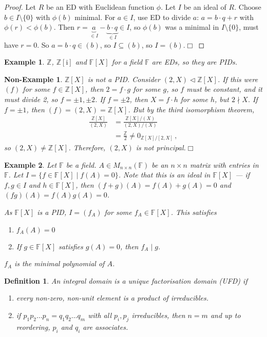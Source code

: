 \documentclass{article}
\theoremstyle{plain}\theoremheaderfont{\normalfont\itshape}\theorembodyfont{\rmfamily}\theoremseparator{.}\newtheorem*{rem}{Remark}\newtheorem*{ex}{Example}\newtheorem*{proof}{Proof}\newtheorem*{altp}{Alternative proof}\newtheorem*{nonex}{Non-Example}
\theoremstyle{plain}\theoremheaderfont{\normalfont\bfseries}\theorembodyfont{\rmfamily}\theoremseparator{.}\newtheorem{thm}{Theorem}[section]\newtheorem{lem}[thm]{Lemma}\newtheorem{prop}[thm]{Proposition}\newtheorem*{cor}{Corollary}\newtheorem{defn}[thm]{Definition}\newtheorem{clm}[thm]{Claim}\newtheorem{clminproof}{Claim}\newtheorem*{notn}{Notation}\newtheorem*{exer}{Exercise}\newtheorem*{lemnn}{Lemma}
\theoremstyle{break}\theoremheaderfont{\normalfont\itshape}\theorembodyfont{\rmfamily}\theoremseparator{.\medskip}\newtheorem*{proofskip}{Proof}\newtheorem*{exs}{Examples}\newtheorem*{rems}{Remarks}\newtheorem*{obs}{Observations}
\theoremstyle{break}\theoremheaderfont{\normalfont\bfseries}\theorembodyfont{\rmfamily}\theoremseparator{.\medskip}\newtheorem{lemskip}[thm]{Lemma}\newtheorem{defnskip}[thm]{Definition}\newtheorem{propskip}[thm]{Proposition}\newtheorem{thmskip}[thm]{Theorem}
\numberwithin{equation}{section}
\newcommand{\qed}{\hfill\ensuremath{\Box}}
\newcommand{\ii}{\mathrm{i}}
\newcommand{\ZZ}{\mathbb{Z}}
\newcommand{\FF}{\mathbb{F}}
\begin{document}
    \begin{proof}
        Let \(R\) be an ED with Euclidean function \(\phi\). Let \(I\) be an ideal of \(R\). Choose \(b\in I\setminus\{0\}\) with \(\phi(b)\) minimal. For \(a\in I\), use ED to divide \(a\): \(a=b\cdot q+r\) with \(\phi(r)<\phi(b)\). Then \(r=\underbrace{a}_{\in I}-\underbrace{b\cdot q}_{\in I}\in I\), so \(\phi(b)\) was a minimal in \(I\setminus\{0\}\), must have \(r=0\). So \(a=b\cdot q\in (b)\), so \(I\subseteq (b)\), so \(I=(b)\).\qed
    \end{proof}
    \begin{ex}
        \(\ZZ\), \(\ZZ[\ii]\) and \(\FF[X]\) for a field \(\FF\) are EDs, so they are PIDs.
    \end{ex}
    \begin{nonex}
        \(\ZZ[X]\) is not a PID. Consider \((2,X)\lhd\ZZ[X]\). If this were \((f)\) for some \(f\in\ZZ[X]\), then \(2=f\cdot g\) for some \(g\), so \(f\) must be constant, and it must divide 2, so \(f=\pm 1, \pm 2\). If \(f=\pm 2\), then \(X=f\cdot h\) for some \(h\), but \(2\nmid X\). If \(f=\pm 1\), then \((f)=(2,X)=\ZZ[X]\). But by the third isomorphism theorem,
        \begin{align*}
            \frac{\ZZ[X]}{(2,X)}&=\frac{\ZZ[X]/(X)}{(2,X)/(X)}\\
            &=\frac{\ZZ}{2}\ne 0_{\ZZ[X]/[2,X]}\,,
        \end{align*}
        so \((2,X)\ne \ZZ[X]\). Therefore, \((2,X)\) is not principal.\qed
    \end{nonex}
    \begin{ex}
        Let \(\FF\) be a field. \(A\in M_{n\times n}(\FF)\) be an \(n\times n\) matrix with entries in \(\FF\). Let \(I=\{f\in \FF[X]\mid f(A)=0\}\). Note that this is an ideal in \(\FF[X]\) --- if \(f,g\in I\) and \(h\in \FF[X]\), then \((f+g)(A)=f(A)+g(A)=0\) and \((fg)(A)=f(A)g(A)=0\).

        As \(\FF[X]\) is a PID, \(I=(f_A)\) for some \(f_A\in\FF[X]\). This satisfies
        \begin{enumerate}[topsep=0pt,label=(\roman*)]
            \item \(f_A(A)=0\)
            \item If \(g\in\FF[X]\) satisfies \(g(A)=0\), then \(f_A\mid g\).
        \end{enumerate}
        \(f_A\) is the \textit{minimal polynomial} of \(A\).
    \end{ex}
    \begin{defn}
        An integral domain is a \textit{unique factorisation domain} (UFD) if
        \begin{enumerate}[topsep=0pt,label=(\roman*)]
            \item every non-zero, non-unit element is a product of irreducibles.
            \item if \(p_1p_2\dots p_n=q_1q_2\dots q_m\) with all \(p_i,p_j\) irreducibles, then \(n=m\) and up to reordering, \(p_i\) and \(q_i\) are associates.
        \end{enumerate}
    \end{defn}
\end{document}
